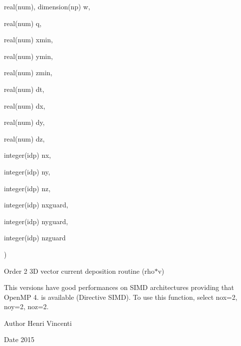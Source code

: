 {\begin{DoxyParamCaption}
\item[{real(num), dimension(np)}]{w, }
\item[{real(num)}]{q, }
\item[{real(num)}]{xmin, }
\item[{real(num)}]{ymin, }
\item[{real(num)}]{zmin, }
\item[{real(num)}]{dt, }
\item[{real(num)}]{dx, }
\item[{real(num)}]{dy, }
\item[{real(num)}]{dz, }
\item[{integer(idp)}]{nx, }
\item[{integer(idp)}]{ny, }
\item[{integer(idp)}]{nz, }
\item[{integer(idp)}]{nxguard, }
\item[{integer(idp)}]{nyguard, }
\item[{integer(idp)}]{nzguard}
\end{DoxyParamCaption}
)}\hypertarget{current__deposition_8_f90_a82878814b59bae3273786c1c0e92deb6}{}\label{current__deposition_8_f90_a82878814b59bae3273786c1c0e92deb6}


Order 2 3D vector current deposition routine (rho$\ast$v) 

This versions have good performances on S\+I\+MD architectures providing that Open\+MP 4. is available (Directive S\+I\+MD). To use this function, select nox=2, noy=2, noz=2. \begin{DoxyAuthor}{Author}
Henri Vincenti 
\end{DoxyAuthor}
\begin{DoxyDate}{Date}
2015 
\end{DoxyDate}

